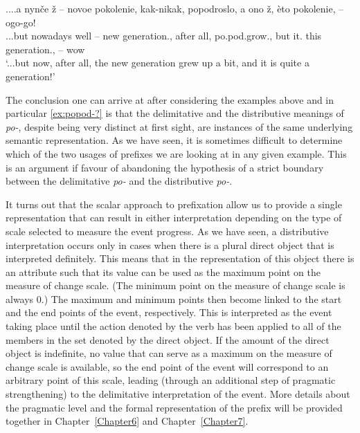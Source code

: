 \exg.\label{ex:popod-?}...a nyn\v{c}e \v{z} – novoe pokolenie, kak-nikak, popodroslo, a ono \v{z}, \`{e}to pokolenie, -- ogo-go!\\
...but nowadays well -- new generation., {after all}, po.pod.grow., but it. {} this generation., -- wow
\\
\trans `...but now, after all, the new generation grew up a bit, and it is quite a generation!'
 
The conclusion one can arrive at after considering the examples above and in particular \ref{ex:popod-?} is that the delimitative and the distributive meanings of \textit{po-}, despite being very distinct at first sight, are instances of the same underlying semantic representation. As we have seen, it is sometimes difficult to determine which of the two usages of prefixes we are looking at in any given example. This is an argument if favour of abandoning the hypothesis of a strict boundary between the delimitative \textit{po-} and the distributive \textit{po-}.

It turns out that the scalar approach to prefixation allow us to provide a single representation that can result in either interpretation depending on the type of scale selected to measure the event progress. As we have seen, a distributive interpretation occurs only in cases when there is a plural direct object that is interpreted definitely. This means that in the representation of this object there is an attribute such that its value can be used as the maximum point on the measure of change scale. (The minimum point on the measure of change scale is always 0.) The maximum and minimum points then become linked to the start and the end points of the event, respectively. This is interpreted as the event taking place until the action denoted by the verb has been applied to all of the members in the set denoted by the direct object. If the amount of the direct object is indefinite, no value that can serve as a maximum on the measure of change scale is available, so the end point of the event will correspond to an arbitrary point of this scale, leading (through an additional step of pragmatic strengthening) to the delimitative interpretation of the event. More details about the pragmatic level and the formal representation of the prefix will be provided together in Chapter~\ref{Chapter6} and Chapter~\ref{Chapter7}.

